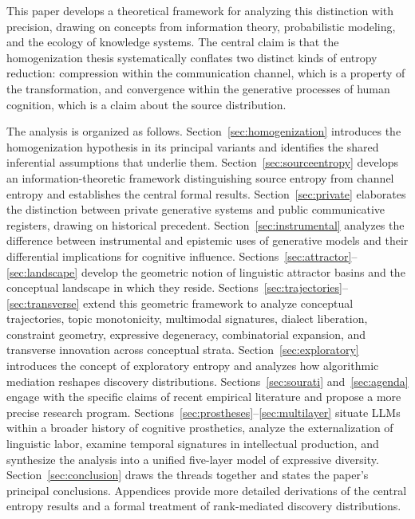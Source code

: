 \documentclass[12pt,a4paper]{article}
\theoremstyle{definition}
\theoremstyle{plain}
\theoremstyle{remark}
\begin{document}
This paper develops a theoretical framework for analyzing this distinction with precision,
drawing on concepts from information theory, probabilistic modeling, and the ecology of
knowledge systems. The central claim is that the homogenization thesis systematically conflates
two distinct kinds of entropy reduction: compression within the communication channel, which
is a property of the transformation, and convergence within the generative processes of human
cognition, which is a claim about the source distribution.

The analysis is organized as follows. Section~\ref{sec:homogenization} introduces the
homogenization hypothesis in its principal variants and identifies the shared inferential
assumptions that underlie them. Section~\ref{sec:sourceentropy} develops an
information-theoretic framework distinguishing source entropy from channel entropy and
establishes the central formal results. Section~\ref{sec:private} elaborates the distinction
between private generative systems and public communicative registers, drawing on historical
precedent. Section~\ref{sec:instrumental} analyzes the difference between instrumental and
epistemic uses of generative models and their differential implications for cognitive
influence. Sections~\ref{sec:attractor}--\ref{sec:landscape} develop the geometric notion
of linguistic attractor basins and the conceptual landscape in which they reside.
Sections~\ref{sec:trajectories}--\ref{sec:transverse} extend this geometric framework
to analyze conceptual trajectories, topic monotonicity, multimodal signatures, dialect
liberation, constraint geometry, expressive degeneracy, combinatorial expansion, and
transverse innovation across conceptual strata.
Section~\ref{sec:exploratory} introduces the concept of exploratory entropy and analyzes
how algorithmic mediation reshapes discovery distributions. Sections~\ref{sec:sourati}
and~\ref{sec:agenda} engage with the specific claims of recent empirical literature and
propose a more precise research program. Sections~\ref{sec:prostheses}--\ref{sec:multilayer}
situate LLMs within a broader history of cognitive prosthetics, analyze the externalization
of linguistic labor, examine temporal signatures in intellectual production, and synthesize
the analysis into a unified five-layer model of expressive diversity. Section~\ref{sec:conclusion} draws
the threads together and states the paper's principal conclusions. Appendices provide more
detailed derivations of the central entropy results and a formal treatment of rank-mediated
discovery distributions.
\end{document}
